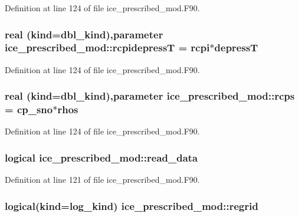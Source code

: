 Definition at line 124 of file ice\_\-prescribed\_\-mod.F90.\hypertarget{namespaceice__prescribed__mod_a1c5ca290fc59d5ca3c0587261be63bfa}{
\subsubsection[{rcpidepressT}]{\setlength{\rightskip}{0pt plus 5cm}real (kind=dbl\_\-kind),parameter {\bf ice\_\-prescribed\_\-mod::rcpidepressT} = {\bf rcpi}$\ast$depressT}}
\label{namespaceice__prescribed__mod_a1c5ca290fc59d5ca3c0587261be63bfa}


Definition at line 124 of file ice\_\-prescribed\_\-mod.F90.\hypertarget{namespaceice__prescribed__mod_a4d489995be632463ce884c66d364ae9b}{
\subsubsection[{rcps}]{\setlength{\rightskip}{0pt plus 5cm}real (kind=dbl\_\-kind),parameter {\bf ice\_\-prescribed\_\-mod::rcps} = {\bf cp\_\-sno}$\ast$rhos}}
\label{namespaceice__prescribed__mod_a4d489995be632463ce884c66d364ae9b}


Definition at line 124 of file ice\_\-prescribed\_\-mod.F90.\hypertarget{namespaceice__prescribed__mod_a07b5b645c36b9f4e6ffecb44561d737e}{
\subsubsection[{read\_\-data}]{\setlength{\rightskip}{0pt plus 5cm}logical {\bf ice\_\-prescribed\_\-mod::read\_\-data}}}
\label{namespaceice__prescribed__mod_a07b5b645c36b9f4e6ffecb44561d737e}


Definition at line 121 of file ice\_\-prescribed\_\-mod.F90.\hypertarget{namespaceice__prescribed__mod_a794e5c02618e82554dc2cec6c635b8f1}{
\subsubsection[{regrid}]{\setlength{\rightskip}{0pt plus 5cm}logical(kind=log\_\-kind) {\bf ice\_\-prescribed\_\-mod::regrid}}}
\label{namespaceice__prescribed__mod_a794e5c02618e82554dc2cec6c635b8f1}


